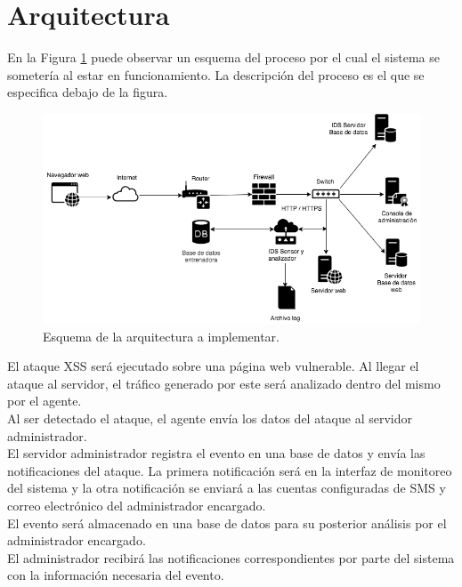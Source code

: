 \section{Arquitectura}

En la Figura \ref{fig:arqui_IDS} puede observar un esquema del proceso por el cual el sistema se sometería al estar en funcionamiento. La descripción del proceso es el que se especifica debajo de la figura.\\


\begin{figure}
	\centering
	\includegraphics[scale=.6]{images/Diagrama_general_de_despliegue}
	\caption{Esquema de la arquitectura a implementar.}
	\label{fig:arqui_IDS}
\end{figure}


El ataque XSS será ejecutado sobre una página web vulnerable. Al llegar el ataque al servidor, el tráfico generado por este será analizado dentro del mismo por el agente.\\

Al ser detectado el ataque, el agente envía los datos del ataque al servidor administrador.\\

El servidor administrador registra el evento en una base de datos y envía las notificaciones del ataque. La primera notificación será en la interfaz de monitoreo del sistema y la otra notificación se enviará a las cuentas configuradas de SMS y correo electrónico del administrador encargado.\\

El evento será almacenado en una base de datos para su posterior análisis por el administrador encargado.\\

El administrador recibirá las notificaciones correspondientes por parte del sistema con la información necesaria del evento.\\

